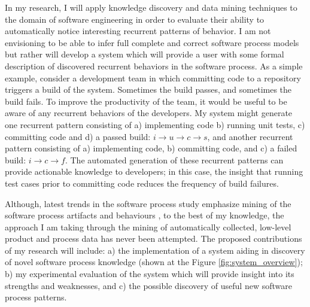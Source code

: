 In my research, I will apply knowledge discovery and data mining techniques to the domain of software engineering in order to evaluate their ability to automatically notice interesting recurrent patterns of behavior. I am not envisioning to be able to infer full complete and correct software process models but rather will develop a system which will provide a user with some formal description of discovered recurrent behaviors in the software process. As a simple example, consider a development team in which committing code to a repository triggers a build of the system. Sometimes the build passes, and sometimes the build fails. To improve the productivity of the team, it would be useful to be aware of any recurrent behaviors of the developers. My system might generate one recurrent pattern consisting of a) implementing code b) running unit tests, c) committing code and d) a passed build: $i \rightarrow u \rightarrow c \rightarrow s $, and another recurrent pattern consisting of a) implementing code, b) committing code, and c) a failed build: $i \rightarrow c \rightarrow f $. The automated generation of these recurrent patterns can provide actionable knowledge to developers; in this case, the insight that running test cases prior to committing code reduces the frequency of build failures.

Although, latest trends in the software process study emphasize mining of the software process artifacts and behaviours \cite{citeulike:5043664} \cite{citeulike:1885717} \cite{citeulike:5112229} \cite{citeulike:1885717}, to the best of my knowledge, the approach I am taking through the mining of 
automatically collected, low-level product and process data has never been attempted. The proposed contributions of my research will include: a) the implementation of a system aiding in discovery of novel software process knowledge (shown at the Figure \ref{fig:system_overview}); b) my experimental evaluation of the system which will provide insight into its strengths and weaknesses, and c) the possible discovery of useful new software process patterns.
